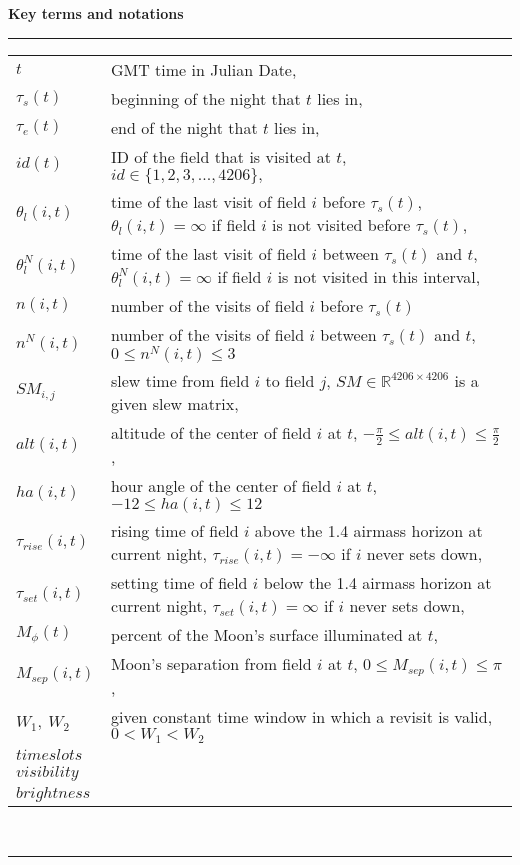 \documentclass[]{spie}  %
\theoremstyle{definition}
\begin{document}
\begin{center}
\textbf{Key terms and notations}\
\noindent\rule{\textwidth}{0.4pt}
\end{center}
\begin{tabular}{ l l  }
$t$& GMT time in Julian Date,\\ %
$\tau_s(t)$& beginning of the night that $t$ lies in,\\
$\tau_e(t)$& end of the night that $t$ lies in,\\
$id(t)$& ID of the field that is visited at $t$, $id \in \{1,2,3,...,4206\},$\\
$\theta_{l}(i,t)$& time of the last visit of field $i$ before $\tau_s(t)$, $\theta_{l}(i,t) = \infty$ if field $i$ is not visited before $\tau_s(t)$,\\
$\theta_{l}^N(i,t)$& time of the last visit of field $i$ between $\tau_s(t)$ and $t$, $\theta_{l}^N(i,t) = \infty$ if field $i$ is not visited in this interval,\\
$n(i,t)$ & number of the visits of field $i$ before $\tau_s(t)$\\
$n^N(i,t)$ & number of the visits of field $i$ between $\tau_s(t)$ and $t$, $0 \leq n^N(i,t) \leq 3$\\
$SM_{i,j}$& slew time from field $i$ to field $j$, $SM \in \mathbb{R}^{4206 \times 4206}$ is a given slew matrix,\\
$alt(i,t)$ & altitude of the center of field $i$ at $t$, $-\frac{\pi}{2} \leq alt(i,t) \leq \frac{\pi}{2}$,\\
$ha(i,t)$ & hour angle of the center of field $i$ at $t$, $-12 \leq ha(i,t) \leq 12$\\
$\tau_{rise}(i,t)$ & rising time of field $i$ above the 1.4 airmass horizon at current night, $\tau_{rise}(i,t) = -\infty$ if $i$ never sets down,\\
$\tau_{set}(i,t)$ & setting time of field $i$ below the 1.4 airmass horizon at current night, $\tau_{set}(i,t) = \infty$ if $i$ never sets down,\\
$M_{\phi}(t)$ & percent of the Moon's surface illuminated at $t$,\\
$M_{sep}(i,t)$ & Moon's separation from field $i$ at $t$, $0 \leq M_{sep}(i,t) \leq \pi$,\\
$W_1,~W_2$ & given constant time window in which a revisit is valid, $0 < W_1 < W_2$\\
$time slots$\\
$visibility$\\
$brightness$\\
\end{tabular}\\
\noindent\rule{\textwidth}{0.4pt}\\
\end{document}
